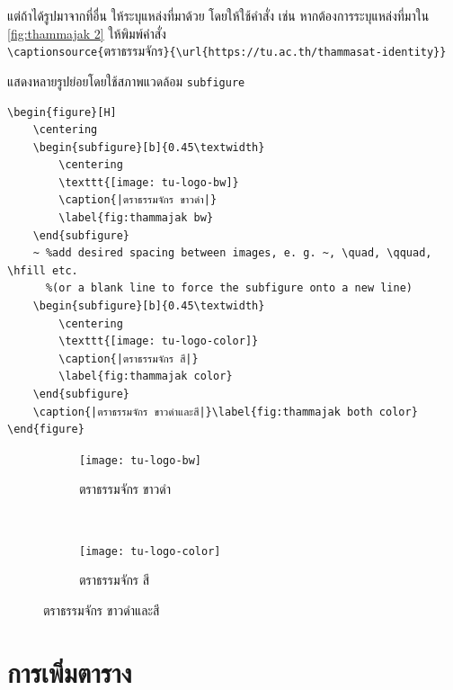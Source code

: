 แต่ถ้าได้รูปมาจากที่อื่น ให้ระบุแหล่งที่มาด้วย โดยให้ใช้คำสั่ง  เช่น หากต้องการระบุแหล่งที่มาใน \autoref{fig:thammajak 2} ให้พิมพ์คำสั่ง \\ \verb|\captionsource{|ตราธรรมจักร\verb|}{\url{https://tu.ac.th/thammasat-identity}}|

\begin{exampleBox}{แสดงหลายรูปย่อยโดยใช้สภาพแวดล้อม \texttt{subfigure}}
\footnotesize
\begin{lstlisting}[frame=none]
\begin{figure}[H]
    \centering
    \begin{subfigure}[b]{0.45\textwidth}
        \centering
        \texttt{[image: tu-logo-bw]}
        \caption{|ตราธรรมจักร ขาวดำ|}
        \label{fig:thammajak bw}
    \end{subfigure}
    ~ %add desired spacing between images, e. g. ~, \quad, \qquad, \hfill etc.
      %(or a blank line to force the subfigure onto a new line)
    \begin{subfigure}[b]{0.45\textwidth}
        \centering
        \texttt{[image: tu-logo-color]}
        \caption{|ตราธรรมจักร สี|}
        \label{fig:thammajak color}
    \end{subfigure}
    \caption{|ตราธรรมจักร ขาวดำและสี|}\label{fig:thammajak both color}
\end{figure}
\end{lstlisting}
\tcblower
\footnotesize
\begin{figure}[H]
    \centering
    \begin{subfigure}[b]{0.45\textwidth}
        \centering
        \texttt{[image: tu-logo-bw]}
        \caption{ตราธรรมจักร ขาวดำ}
        \label{fig:thammajak bw}
    \end{subfigure}
    ~ %
    \begin{subfigure}[b]{0.45\textwidth}
        \centering
        \texttt{[image: tu-logo-color]}
        \caption{ตราธรรมจักร สี}
        \label{fig:thammajak color}
    \end{subfigure}
    \caption{ตราธรรมจักร ขาวดำและสี}\label{fig:thammajak both color}
\end{figure}
\end{exampleBox}


\newpage
\section{การเพิ่มตาราง}

